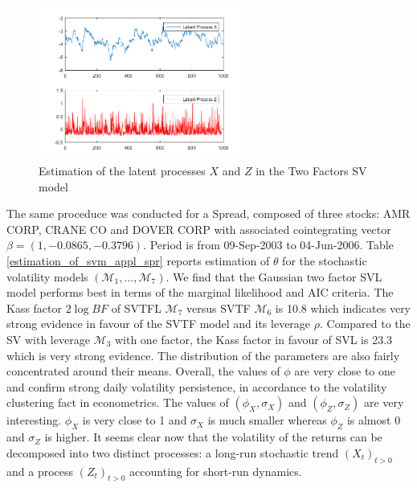 \documentclass[11pt,a4,twosided,singlespacing,titlepagenumber=on]{scrreprt}
\numberwithin{equation}{chapter} %
\theoremstyle{remark}
\begin{document}
\begin{figure}[H]
\centering
\includegraphics[width = 0.6\textwidth]{appl_twofactors_latent_processes}
\caption{Estimation of the latent processes $X$ and $Z$ in the Two Factors SV model}
\label{appl_twofactors_latent_processes}
\end{figure}

The same proceduce was conducted for a Spread, composed of three stocks: AMR CORP, CRANE CO and DOVER CORP with associated cointegrating vector $\beta = (1, -0.0865, -0.3796)$. Period is from 09-Sep-2003 to 04-Jun-2006. Table \ref{estimation_of_svm_appl_spr} reports estimation of $\theta$ for the stochastic volatility models $(\mathcal{M}_1, ..., \mathcal{M}_7)$. We find that the Gaussian two factor SVL model performs best in terms of the marginal likelihood and AIC criteria. The Kass factor $2 \log BF$ of SVTFL $\mathcal{M}_7$ versus SVTF $\mathcal{M}_6$ is 10.8 which indicates very strong evidence in favour of the SVTF model and its leverage $\rho$. Compared to the SV with leverage $\mathcal{M}_3$ with one factor, the Kass factor in favour of SVL is 23.3 which is very strong evidence. The distribution of the parameters are also fairly concentrated around their means. Overall, the values of $\phi$ are very close to one and confirm strong daily volatility persistence, in accordance to the volatility clustering fact in econometrics. The values of $(\phi_X, \sigma_X)$ and $(\phi_Z, \sigma_Z)$ are very interesting. $\phi_X$ is very close to 1 and $\sigma_X$ is much smaller whereas $\phi_Z$ is almost 0 and $\sigma_Z$ is higher. It seems clear now that the volatility of the returns can be decomposed into two distinct processes: a long-run stochastic trend $(X_t)_{t>0}$ and a process $(Z_t)_{t>0}$ accounting for short-run dynamics.
\end{document}
